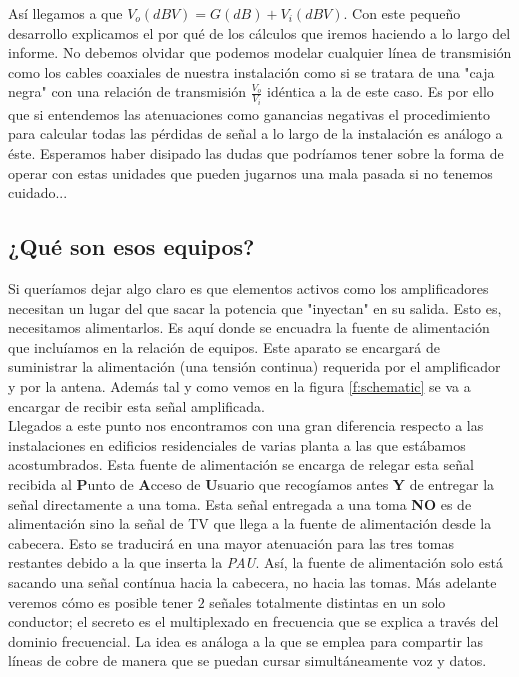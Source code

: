 \documentclass{article}[12 pt]
\begin{document}
			Así llegamos a que $V_o(dBV) = G(dB) + V_i(dBV)$. Con este pequeño desarrollo explicamos el por qué de los cálculos que iremos haciendo a lo largo del informe. No debemos olvidar que podemos modelar cualquier línea de transmisión como los cables coaxiales de nuestra instalación como si se tratara de una "caja negra" con una relación de transmisión $\frac{V_o}{V_i}$ idéntica a la de este caso. Es por ello que si entendemos las atenuaciones como ganancias negativas el procedimiento para calcular todas las pérdidas de señal a lo largo de la instalación es análogo a éste. Esperamos haber disipado las dudas que podríamos tener sobre la forma de operar con estas unidades que pueden jugarnos una mala pasada si no tenemos cuidado...\\

		\subsection{¿Qué son esos equipos?}
			Si queríamos dejar algo claro es que elementos activos como los amplificadores necesitan un lugar del que sacar la potencia que "inyectan" en su salida. Esto es, necesitamos alimentarlos. Es aquí donde se encuadra la fuente de alimentación que incluíamos en la relación de equipos. Este aparato se encargará de suministrar la alimentación (una tensión continua) requerida por el amplificador y por la antena. Además tal y como vemos en la figura \ref{f:schematic} se va a encargar de recibir esta señal amplificada.\\

			Llegados a este punto nos encontramos con una gran diferencia respecto a las instalaciones en edificios residenciales de varias planta a las que estábamos acostumbrados. Esta fuente de alimentación se encarga de relegar esta señal recibida al \textbf{P}unto de \textbf{A}cceso de \textbf{U}suario que recogíamos antes \textbf{Y} de entregar la señal directamente a una toma. Esta señal entregada a una toma \textbf{NO} es de alimentación sino la señal de TV que llega a la fuente de alimentación desde la cabecera. Esto se traducirá en una mayor atenuación para las tres tomas restantes debido a la que inserta la \textit{PAU}. Así, la fuente de alimentación solo está sacando una señal contínua hacia la cabecera, no hacia las tomas. Más adelante veremos cómo es posible tener $2$ señales totalmente distintas en un solo conductor; el secreto es el multiplexado en frecuencia que se explica a través del dominio frecuencial. La idea es análoga a la que se emplea para compartir las líneas de cobre de manera que se puedan cursar simultáneamente voz y datos.\\
\end{document}
